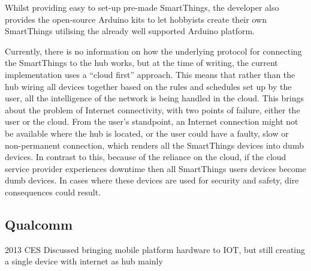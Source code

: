 Whilst providing easy to set-up pre-made SmartThings, the developer also provides the open-source Arduino kits to let hobbyists create their own SmartThings utilising the already well supported Arduino platform.

Currently, there is no information on how the underlying protocol for connecting the SmartThings to the hub works, but at the time of writing, the current implementation uses a ``cloud first'' approach. This means that rather than the hub wiring all devices together based on the rules and schedules set up by the user, all the intelligence of the network is being handled in the cloud. This brings about the problem of Internet connectivity, with two points of failure, either the user or the cloud. From the user's standpoint, an Internet connection might not be available where the hub is located, or the user could have a faulty, slow or non-permanent connection, which renders all the SmartThings devices into dumb devices. In contrast to this, because of the reliance on the cloud, if the cloud service provider experiences downtime then all SmartThings users devices become dumb devices. In cases where these devices are used for security and safety, dire consequences could result.
  



\subsection{Qualcomm} %
\label{sub:qualcomm}
2013 CES Discussed bringing mobile platform hardware to IOT, but still creating a single device with internet as hub mainly 


